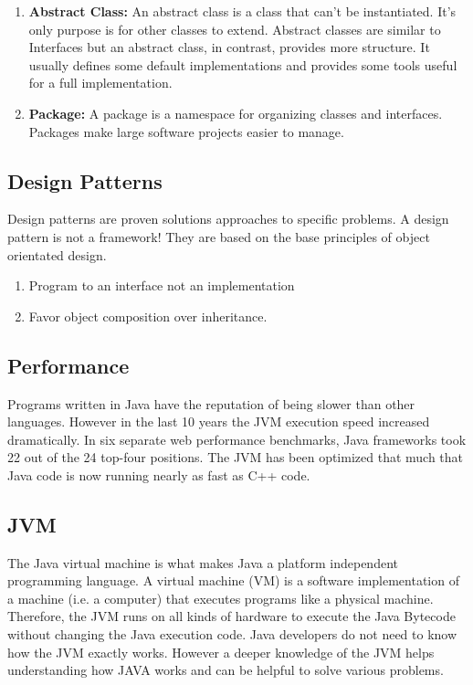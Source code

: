 \begin{enumerate}
\item \textbf{Abstract Class:}
An abstract class is a class that can't be instantiated. It's only purpose is for other classes to extend. Abstract classes are similar to Interfaces but an abstract class, in contrast, provides more structure. It usually defines some default implementations and provides some tools useful for a full implementation.\cite{javaAbstractVsInterface}

\item \textbf{Package:} 
A package is a namespace for organizing classes and interfaces. Packages make large software projects easier to manage. \cite{javaOBjectOracle}
\end{enumerate}


\subsection{Design Patterns}
Design patterns are proven solutions approaches to specific problems. A design pattern is not a framework! They are based on the base principles of object orientated design. 

\begin{enumerate}
\item Program to an interface not an implementation
\item Favor object composition over inheritance.
\end{enumerate}

\subsection{Performance}
Programs written in Java have the reputation of being slower than other languages. However in the last 10 years the JVM execution speed increased dramatically. In six separate web performance benchmarks, Java frameworks took 22 out of the 24 top-four positions. The JVM has been optimized that much that Java code is now running nearly as fast as C++ code. \cite{javaPerfromance}

\subsection{JVM}
The Java virtual machine is what makes Java a platform independent programming language. A virtual machine (VM) is a software implementation of a machine (i.e. a computer) that executes programs like a physical machine. Therefore, the JVM runs on all kinds of hardware to execute the Java Bytecode without changing the Java execution code. Java developers do not need to know how the JVM exactly works. However a deeper knowledge of the JVM helps understanding how JAVA works and can be helpful to solve various problems.\cite{javaJVM} 
\\

